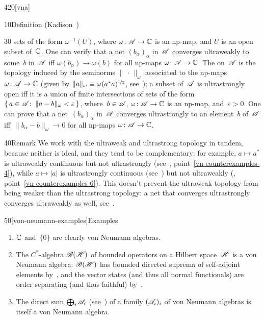\begin{parsec}{420}[vna]
\begin{point}{10}{Definition (Kadison~\cite{kadison1956})}
\begin{point}{30}
sets of the form $\omega^{-1}(U)$, where
$\omega\colon \mathscr{A}\to\mathbb{C}$ is an np-map, 
and $U$ is an open subset of~$\mathbb{C}$.
One can verify that a net $(b_\alpha)_\alpha$
in~$\mathscr{A}$ converges ultraweakly to some~$b$ in~$\mathscr{A}$
    iff $\omega(b_\alpha)\to \omega(b)$ for all
    np-maps $\omega\colon \mathscr{A}\to\mathbb{C}$.
The %
	on~$\mathscr{A}$
is the topology
induced by the seminorms
$\|\,\cdot\,\|_\omega$
associated to the np-maps $\omega\colon \mathscr{A}\to\mathbb{C}$
    (given by
$\|a\|_\omega \equiv \omega(a^*a)^{\nicefrac{1}{2}}$,
    see~);
a subset of~$\mathscr{A}$ is ultrastrongly open
iff it is a union of finite intersections
of sets of the form
$\{\,a\in\mathscr{A}\colon\, \|a-b\|_\omega < \varepsilon\,\}$,
where~$b\in \mathscr{A}$, $\omega\colon \mathscr{A}\to\mathbb{C}$ is an np-map,
and~$\varepsilon>0$.
One can prove that a net~$(b_\alpha)_\alpha$
in~$\mathscr{A}$
converges ultrastrongly to an element~$b$ of~$\mathscr{A}$
    iff~$\|b_\alpha-b\|_\omega\to 0$ for all np-maps 
    $\omega\colon \mathscr{A}\to\mathbb{C}$.
\end{point}
\end{point}
\begin{point}{40}{Remark}%
We work with the ultraweak and ultrastrong topology in tandem,
because neither is ideal, and they tend to be complementary:
for example, $a\mapsto a^*$ is ultraweakly continuous
but not ultrastrongly (see~,
point~\ref{vn-counterexamples-4}), 
while $a\mapsto \left|a\right|$
is ultrastrongly continuous (see~)
but not ultraweakly (, 
point~\ref{vn-counterexamples-6}).
This doesn't prevent 
the ultraweak topology 
from being weaker than the ultrastrong topology:
a net that converges ultrastrongly converges ultraweakly as well,
see~.
\end{point}
\begin{point}{50}[von-neumann-examples]{Examples}%
\begin{enumerate}
\item
{}%
$\mathbb{C}$ and~$\{0\}$ are clearly von Neumann algebras.
\item
{}
The $C^*$-algebra $\mathscr{B}(\mathscr{H})$
of bounded operators on a Hilbert space~$\mathscr{H}$
is a von Neumann algebra:
$\mathscr{B}(\mathscr{H})$ has bounded directed suprema
of self-adjoint elements
by~,
and the vector states
(and thus all normal functionals)
are order separating
(and thus faithful)
by~.
\item%
%
The direct sum $\bigoplus_i \mathscr{A}_i$
(see~)
of a family $(\mathscr{A}_i)_i$
of von Neumann algebras
is itself a von Neumann algebra.


\end{enumerate}
\end{point}
\end{parsec}
